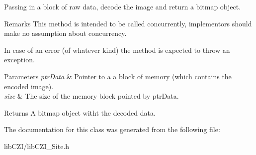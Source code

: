 Passing in a block of raw data, decode the image and return a bitmap object. \begin{DoxyRemark}{Remarks}
This method is intended to be called concurrently, implementors should make no assumption about concurrency.

In case of an error (of whatever kind) the method is expected to throw an exception.
\end{DoxyRemark}

\begin{DoxyParams}{Parameters}
{\em ptr\+Data} & Pointer to a a block of memory (which contains the encoded image). \\
\hline
{\em size} & The size of the memory block pointed by {\ttfamily ptr\+Data}.\\
\hline
\end{DoxyParams}
\begin{DoxyReturn}{Returns}
A bitmap object witht the decoded data. 
\end{DoxyReturn}


The documentation for this class was generated from the following file\+:\begin{DoxyCompactItemize}
\item 
lib\+C\+Z\+I/lib\+C\+Z\+I\+\_\+\+Site.\+h\end{DoxyCompactItemize}
